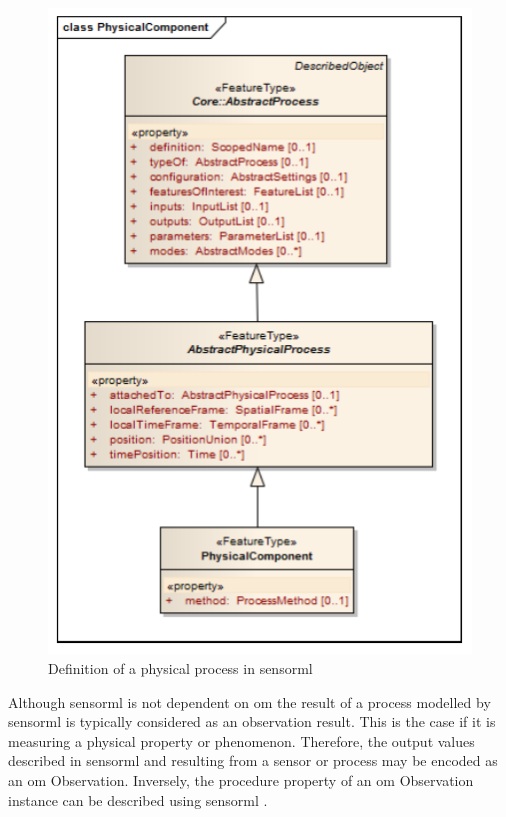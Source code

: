 \begin{figure}
	\centering
	\includegraphics[width=0.6\linewidth]{UML/physicalProcess.png}
	\caption{Definition of a physical process in \ac{sensorml} \citep[p. 57]{SW:OGC7}}
	\label{fig:physicalProcess}
\end{figure}

Although \ac{sensorml} is not dependent on \ac{om} the result of a process modelled by \ac{sensorml} is typically considered as an observation result. This is the case if it is measuring a physical property or phenomenon. Therefore, the output values described in \ac{sensorml} and resulting from a sensor or process may be encoded as an \ac{om} Observation. Inversely, the procedure property of an \ac{om} Observation instance can be described using \ac{sensorml} \citep{SW:OGC7}.

